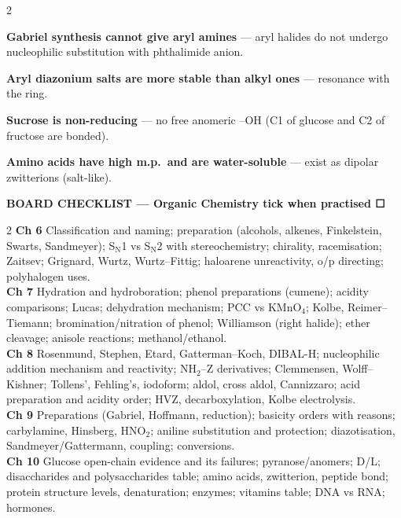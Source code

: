 \documentclass[9pt,a4paper]{extarticle}
\begin{document}
\begin{multicols}{2}
{\begin{fl}
\item \textbf{Gabriel synthesis cannot give aryl amines} — aryl halides do not undergo nucleophilic substitution with phthalimide anion.
\item \textbf{Aryl diazonium salts are more stable than alkyl ones} — resonance with the ring.
\item \textbf{Sucrose is non-reducing} — no free anomeric --OH (C1 of glucose and C2 of fructose are bonded).
\item \textbf{Amino acids have high m.p.\ and are water-soluble} — exist as dipolar zwitterions (salt-like).
\end{fl}\par}
\end{multicols}

\clearpage
\begin{tcolorbox}[enhanced,colback=navy,colframe=navy,arc=2pt,left=6pt,right=6pt,top=2pt,bottom=2pt,before skip=4pt]
\color{white}\sffamily\bfseries\small BOARD CHECKLIST — Organic Chemistry \hfill\footnotesize\mdseries tick when practised ☐
\end{tcolorbox}
\begin{multicols}{2}\raggedcolumns
\scriptsize
\textbf{\textcolor{uVI}{Ch 6}} Classification and naming; preparation (alcohols, alkenes, Finkelstein, Swarts, Sandmeyer); S$_\text{N}$1 vs S$_\text{N}$2 with stereochemistry; chirality, racemisation; Zaitsev; Grignard, Wurtz, Wurtz--Fittig; haloarene unreactivity, o/p directing; polyhalogen uses.\\
\textbf{\textcolor{uVII}{Ch 7}} Hydration and hydroboration; phenol preparations (cumene); acidity comparisons; Lucas; dehydration mechanism; PCC vs KMnO$_4$; Kolbe, Reimer--Tiemann; bromination/nitration of phenol; Williamson (right halide); ether cleavage; anisole reactions; methanol/ethanol.\\
\textbf{\textcolor{uVIII}{Ch 8}} Rosenmund, Stephen, Etard, Gatterman--Koch, DIBAL-H; nucleophilic addition mechanism and reactivity; NH$_2$--Z derivatives; Clemmensen, Wolff--Kishner; Tollens', Fehling's, iodoform; aldol, cross aldol, Cannizzaro; acid preparation and acidity order; HVZ, decarboxylation, Kolbe electrolysis.\\
\textbf{\textcolor{uIX}{Ch 9}} Preparations (Gabriel, Hoffmann, reduction); basicity orders with reasons; carbylamine, Hinsberg, HNO$_2$; aniline substitution and protection; diazotisation, Sandmeyer/Gattermann, coupling; conversions.\\
\textbf{\textcolor{uX}{Ch 10}} Glucose open-chain evidence and its failures; pyranose/anomers; D/L; disaccharides and polysaccharides table; amino acids, zwitterion, peptide bond; protein structure levels, denaturation; enzymes; vitamins table; DNA vs RNA; hormones.
\end{multicols}

\begin{tcolorbox}[enhanced,colback=white,colframe=navy,boxrule=0.8pt,arc=2pt,title={\sffamily\bfseries\footnotesize My notes},colbacktitle=navy,coltitle=white,height fill,before skip=4pt]
\end{tcolorbox}
\end{document}

